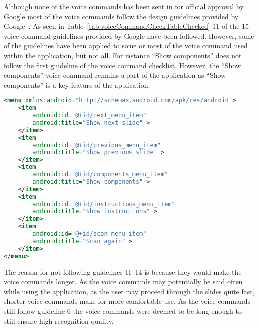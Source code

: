 Although none of the voice commands has been sent in for official approval by Google most of the voice commands follow the design guidelines provided by Google~\cite{glassVoiceChecklist}. As seen in Table~\ref{tab:voiceCommandCheckTableChecked} 11 of the 15 voice command guidelines provided by Google have been followed. However, some of the guidelines have been applied to some or most of the voice command used within the application, but not all. For instance ``Show components'' does not follow the first guideline of the voice command checklist. However, the ``Show components'' voice command remains a part of the application as ``Show components'' is a key feature of the application.

\begin{lstlisting}[language=XML, caption={The voice command menu XML file}, label=voiceCommandXML]
<menu xmlns:android="http://schemas.android.com/apk/res/android">
	<item
		android:id="@+id/next_menu_item"
		android:title="Show next slide" >
	</item>
	<item
		android:id="@+id/previous_menu_item"
		android:title="Show previous slide" >
	</item>
	<item
		android:id="@+id/components_menu_item"
		android:title="Show components" >
	</item>
	<item
		android:id="@+id/instructions_menu_item"
		android:title="Show instructions" >
	</item>
	<item
		android:id="@+id/scan_menu_item"
		android:title="Scan again" >
	</item>
</menu>
\end{lstlisting}



The reason for not following guidelines 11--14 is because they would make the voice commands longer. As the voice commands may potentially be said often while using the application, as the user may proceed through the slides quite fast, shorter voice commands make for more comfortable use. As the voice commands still follow guideline 6 the voice commands were deemed to be long enough to still ensure high recognition quality.